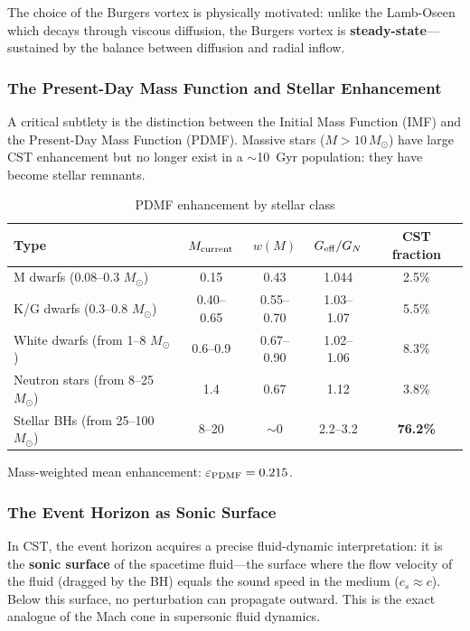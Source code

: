 \documentclass[11pt,a4paper]{article}
\begin{document}
The choice of the Burgers vortex is physically motivated: unlike the Lamb-Oseen which decays through viscous diffusion, the Burgers vortex is \textbf{steady-state}---sustained by the balance between diffusion and radial inflow.

\subsubsection{The Present-Day Mass Function and Stellar Enhancement}

A critical subtlety is the distinction between the Initial Mass Function (IMF) and the Present-Day Mass Function (PDMF). Massive stars ($M > 10\,M_\odot$) have large CST enhancement but no longer exist in a $\sim$10~Gyr population: they have become stellar remnants.

\begin{table}[h]
\centering
\caption{PDMF enhancement by stellar class}
\begin{tabular}{lcccc}
\toprule
Type & $M_{\rm current}$ & $w(M)$ & $G_{\rm eff}/G_N$ & CST fraction \\
\midrule
M dwarfs (0.08--0.3 $M_\odot$) & 0.15 & 0.43 & 1.044 & 2.5\% \\
K/G dwarfs (0.3--0.8 $M_\odot$) & 0.40--0.65 & 0.55--0.70 & 1.03--1.07 & 5.5\% \\
White dwarfs (from 1--8 $M_\odot$) & 0.6--0.9 & 0.67--0.90 & 1.02--1.06 & 8.3\% \\
Neutron stars (from 8--25 $M_\odot$) & 1.4 & 0.67 & 1.12 & 3.8\% \\
Stellar BHs (from 25--100 $M_\odot$) & 8--20 & $\sim$0 & 2.2--3.2 & \textbf{76.2\%} \\
\bottomrule
\end{tabular}
\end{table}

Mass-weighted mean enhancement: $\varepsilon_{\rm PDMF} = 0.215$.

\subsubsection{The Event Horizon as Sonic Surface}

In CST, the event horizon acquires a precise fluid-dynamic interpretation: it is the \textbf{sonic surface} of the spacetime fluid---the surface where the flow velocity of the fluid (dragged by the BH) equals the sound speed in the medium ($c_s \approx c$). Below this surface, no perturbation can propagate outward. This is the exact analogue of the Mach cone in supersonic fluid dynamics.
\end{document}
